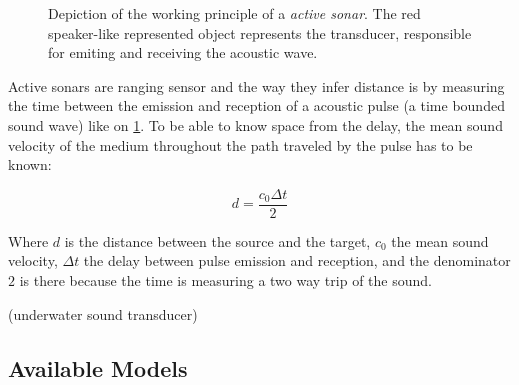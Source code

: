 \begin{figure}
	\centering
	
	\caption{Depiction of the working principle of a \textit{active sonar}. The
	red speaker-like represented object represents the transducer, responsible for
	emiting and receiving the acoustic wave.}
	\label{fig:sonar_principle}
\end{figure}

Active sonars are ranging sensor and the way they infer distance is by measuring
the time between the emission and reception of a acoustic pulse (a time bounded
sound wave) like on \ref{fig:sonar_principle}. To be able to know space from the
delay, the mean sound velocity of the medium throughout the path traveled by the
pulse has to be known\cite{LURTON}:

\[ d = \frac{c_0 \Delta t}{2}  \]

Where $d$ is the distance between the source and the target, $c_0$ the mean
sound velocity, $\Delta t$ the delay between pulse emission and reception, and
the denominator $2$ is there because the time is measuring a two way trip of
the sound.

(underwater sound transducer)



\subsection{Available Models}
\label{ss:avaible_models}
 
\cite{sonars:16} %
